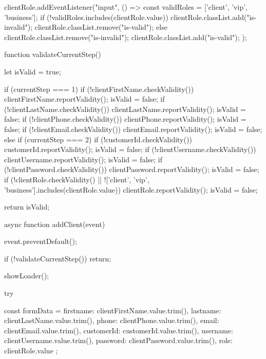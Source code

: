 {    clientRole.addEventListener("input", () => {
        const validRoles = ['client', 'vip', 'business'];
        if (!validRoles.includes(clientRole.value)) {
            clientRole.classList.add("is-invalid");
            clientRole.classList.remove("is-valid");
        } else {
            clientRole.classList.remove("is-invalid");
            clientRole.classList.add("is-valid");
        }
    });

    function validateCurrentStep() {
        let isValid = true;

        if (currentStep === 1) {
            if (!clientFirstName.checkValidity()) {
                clientFirstName.reportValidity();
                isValid = false;
            }
            if (!clientLastName.checkValidity()) {
                clientLastName.reportValidity();
                isValid = false;
            }
            if (!clientPhone.checkValidity()) {
                clientPhone.reportValidity();
                isValid = false;
            }
            if (!clientEmail.checkValidity()) {
                clientEmail.reportValidity();
                isValid = false;
            }
        } else if (currentStep === 2) {
            if (!customerId.checkValidity()) {
                customerId.reportValidity();
                isValid = false;
            }
            if (!clientUsername.checkValidity()) {
                clientUsername.reportValidity();
                isValid = false;
            }
            if (!clientPassword.checkValidity()) {
                clientPassword.reportValidity();
                isValid = false;
            }
            if (!clientRole.checkValidity() || !['client', 'vip', 'business'].includes(clientRole.value)) {
                clientRole.reportValidity();
                isValid = false;
            }
        }

        return isValid;
    }

    async function addClient(event) {
        event.preventDefault();

        if (!validateCurrentStep()) return;

        showLoader();

        try {
            const formData = {
                firstname: clientFirstName.value.trim(),
                lastname: clientLastName.value.trim(),
                phone: clientPhone.value.trim(),
                email: clientEmail.value.trim(),
                customerId: customerId.value.trim(),
                username: clientUsername.value.trim(),
                password: clientPassword.value.trim(),
                role: clientRole.value
            };

}}}
